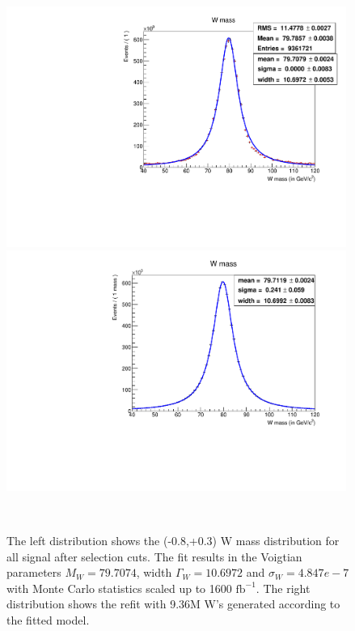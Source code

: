 \begin{figure}

\centering
    \begin{minipage}{0.49\textwidth}
        \centering
        \includegraphics[width=0.99\textwidth]{WWSfit.pdf} %
   
    \end{minipage}\hfill
    \begin{minipage}{0.49\textwidth}
        \centering
        \includegraphics[width=0.99\textwidth]{Wtoyfit.pdf} %
     
     \end{minipage}\\
     \caption{ The left distribution shows the (-0.8,+0.3) W mass distribution for all signal after selection cuts. The fit results in the Voigtian parameters $M_W = 79.7074$, width $\Gamma_W = 10.6972$ and $\sigma_W = 4.847e-7$ with Monte Carlo statistics scaled up to 1600 $\text{fb}^{-1}$. The right distribution shows the refit with 9.36M W's generated according to the fitted model.}
\label{fig:badfit}


\end{figure}


